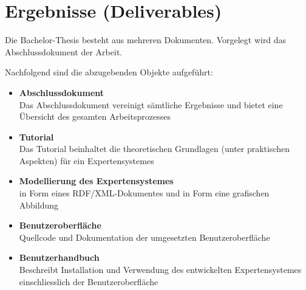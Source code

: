 \section{Ergebnisse (Deliverables)}
\label{sec:admin_ergebniss}
Die Bachelor-Thesis besteht aus mehreren Dokumenten. Vorgelegt wird das Abschlussdokument der Arbeit.

Nachfolgend sind die abzugebenden Objekte aufgeführt:
\begin{itemize}
	\item \textbf{Abschlussdokument} \\
        Das Abschlussdokument vereinigt sämtliche Ergebnisse und bietet eine Übersicht des gesamten Arbeitsprozesses
	\item \textbf{Tutorial} \\
        Das Tutorial beinhaltet die theoretischen Grundlagen (unter praktischen Aspekten) für ein Expertensystemes
	\item \textbf{Modellierung des Expertensystemes} \\
        in Form eines RDF/XML-Dokumentes und in Form eine grafischen Abbildung
	\item \textbf{Benutzeroberfläche} \\
        Quellcode und Dokumentation der umgesetzten Benutzeroberfläche
	\item \textbf{Benutzerhandbuch} \\
        Beschreibt Installation und Verwendung des entwickelten Expertensystemes einschliesslich der Benutzeroberfläche
\end{itemize}
